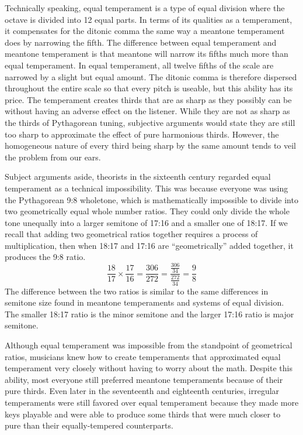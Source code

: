 Technically speaking, equal temperament is a type of equal division where the octave is
divided into 12 equal parts.  In terms of its qualities as a temperament, it compensates
for the ditonic comma the same way a meantone temperament does by narrowing the fifth. The
difference between equal temperament and meantone temperament is that meantone will narrow
its fifths much more than equal temperament.  In equal temperament, all twelve fifths of
the scale are narrowed by a slight but equal amount.  The ditonic comma is therefore
dispersed throughout the entire scale so that every pitch is useable, but this ability has
its price.  The temperament creates thirds that are as sharp as they possibly can be
without having an adverse effect on the listener.  While they are not as sharp as the
thirds of Pythagorean tuning, subjective arguments would state they are still too sharp to
approximate the effect of pure harmonious thirds.  However, the homogeneous nature of
every third being sharp by the same amount tends to veil the problem from our ears.

Subject arguments aside, theorists in the sixteenth century regarded equal temperament as
a technical impossibility. This was because everyone was using the Pythagorean 9:8
wholetone, which is mathematically impossible to divide into two geometrically equal whole
number ratios. They could only divide the whole tone unequally into a larger semitone of
17:16 and a smaller one of 18:17. \autocite[20]{ML:1} If we recall that adding two
geometrical ratios together requires a process of multiplication, then when 18:17 and
17:16 are ``geometrically'' added together, it produces the 9:8 ratio.
\begin{equation}
  \frac{18}{17} \times
  \frac{17}{16} =
  \frac{306}{272} =
  \frac{\frac{306}{34}}{\frac{272}{34}} =
  \frac{9}{8}
\end{equation}
The difference between the two ratios is similar to the same differences in semitone size
found in meantone temperaments and systems of equal division.  The smaller 18:17 ratio is
the minor semitone and the larger 17:16 ratio is major semitone.

Although equal temperament was impossible from the standpoint of geometrical ratios,
musicians knew how to create temperaments that approximated equal temperament very closely
without having to worry about the math.  Despite this ability, most everyone still
preferred meantone temperaments because of their pure thirds. Even later in the
seventeenth and eighteenth centuries, irregular temperaments were still favored over equal
temperament because they made more keys playable and were able to produce some thirds that
were much closer to pure than their equally-tempered counterparts.

